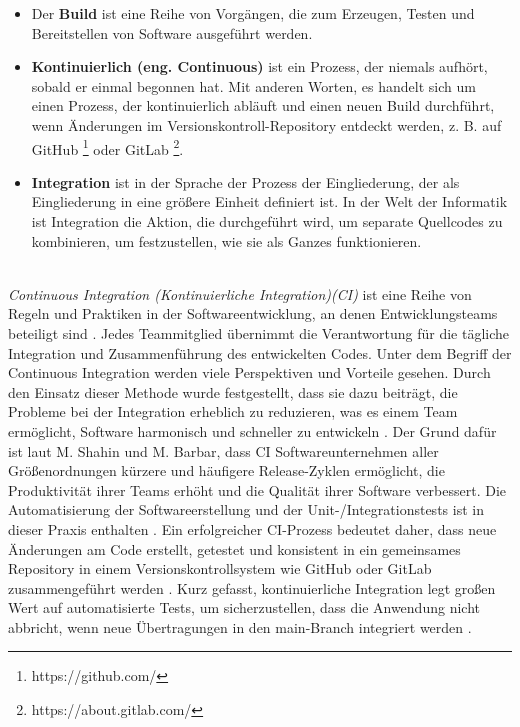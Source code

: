 \begin{itemize}
	\item Der \textbf{Build}  ist eine Reihe von Vorgängen, die zum Erzeugen, Testen und Bereitstellen von Software ausgeführt werden.
	
	\item \textbf{Kontinuierlich (eng. Continuous)} ist ein Prozess, der niemals aufhört, sobald er einmal begonnen hat. Mit anderen Worten, es handelt sich um einen Prozess, der kontinuierlich abläuft und einen neuen Build durchführt, wenn Änderungen im Versionskontroll-Repository entdeckt werden, z. B. auf GitHub \footnote{https://github.com/} oder GitLab \footnote{https://about.gitlab.com/}.
	
	\item \textbf{Integration} ist in der Sprache der Prozess der Eingliederung, der als Eingliederung in eine größere Einheit definiert ist. In der Welt der Informatik ist Integration die Aktion, die durchgeführt wird, um separate Quellcodes zu kombinieren, um festzustellen, wie sie als Ganzes funktionieren.
	
\end{itemize}
\ \\
\textit{Continuous Integration (Kontinuierliche Integration)(CI)} ist eine Reihe von Regeln und Praktiken in der Softwareentwicklung, an denen Entwicklungsteams beteiligt sind \cite{Meyer2014}. Jedes Teammitglied übernimmt die Verantwortung für die tägliche Integration und Zusammenführung des entwickelten Codes. Unter dem Begriff der Continuous Integration werden viele Perspektiven und Vorteile gesehen. Durch den Einsatz dieser Methode wurde festgestellt, dass sie dazu beiträgt, die Probleme bei der Integration erheblich zu reduzieren, was es einem Team ermöglicht, Software harmonisch und schneller zu entwickeln \cite{Fowler2006}. Der Grund dafür ist laut M. Shahin und M. Barbar, dass CI Softwareunternehmen aller Größenordnungen kürzere und häufigere Release-Zyklen ermöglicht, die Produktivität ihrer Teams erhöht und die Qualität ihrer Software verbessert. Die Automatisierung der Softwareerstellung und der Unit-/Integrationstests ist in dieser Praxis enthalten \cite{Shahin2017}. Ein erfolgreicher CI-Prozess bedeutet daher, dass neue Änderungen am Code erstellt, getestet und konsistent in ein gemeinsames Repository in einem Versionskontrollsystem wie GitHub oder GitLab zusammengeführt werden \cite{RedHat2018}. Kurz gefasst, kontinuierliche Integration legt großen Wert auf automatisierte Tests, um sicherzustellen, dass die Anwendung nicht abbricht, wenn neue Übertragungen in den main-Branch integriert werden \cite{Atlassian}.

